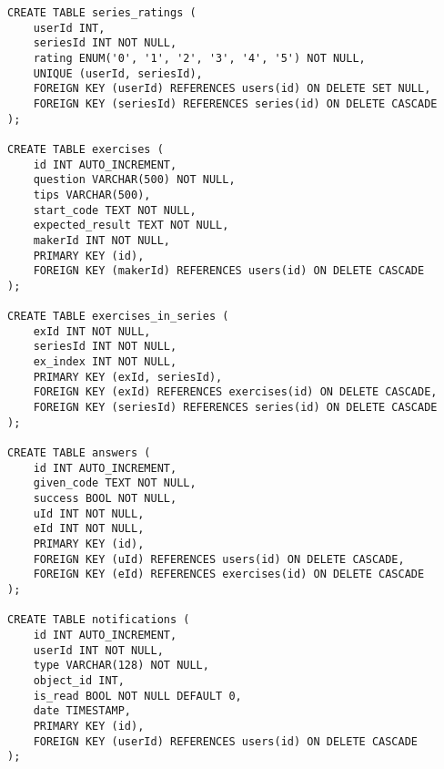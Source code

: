 \begin{lstlisting}
CREATE TABLE series_ratings (
    userId INT,
    seriesId INT NOT NULL,
    rating ENUM('0', '1', '2', '3', '4', '5') NOT NULL,
    UNIQUE (userId, seriesId),
    FOREIGN KEY (userId) REFERENCES users(id) ON DELETE SET NULL,
    FOREIGN KEY (seriesId) REFERENCES series(id) ON DELETE CASCADE
);

CREATE TABLE exercises (
    id INT AUTO_INCREMENT,
    question VARCHAR(500) NOT NULL,
    tips VARCHAR(500),
    start_code TEXT NOT NULL,
    expected_result TEXT NOT NULL,
    makerId INT NOT NULL,
    PRIMARY KEY (id),
    FOREIGN KEY (makerId) REFERENCES users(id) ON DELETE CASCADE
);

CREATE TABLE exercises_in_series (
    exId INT NOT NULL,
    seriesId INT NOT NULL,
    ex_index INT NOT NULL,
    PRIMARY KEY (exId, seriesId),
    FOREIGN KEY (exId) REFERENCES exercises(id) ON DELETE CASCADE,
    FOREIGN KEY (seriesId) REFERENCES series(id) ON DELETE CASCADE
);

CREATE TABLE answers (
    id INT AUTO_INCREMENT,
    given_code TEXT NOT NULL,
    success BOOL NOT NULL,
    uId INT NOT NULL,
    eId INT NOT NULL,
    PRIMARY KEY (id),
    FOREIGN KEY (uId) REFERENCES users(id) ON DELETE CASCADE,
    FOREIGN KEY (eId) REFERENCES exercises(id) ON DELETE CASCADE
);

CREATE TABLE notifications (
    id INT AUTO_INCREMENT,
    userId INT NOT NULL,
    type VARCHAR(128) NOT NULL,
    object_id INT,
    is_read BOOL NOT NULL DEFAULT 0,
    date TIMESTAMP,
    PRIMARY KEY (id),
    FOREIGN KEY (userId) REFERENCES users(id) ON DELETE CASCADE
);
\end{lstlisting}    
